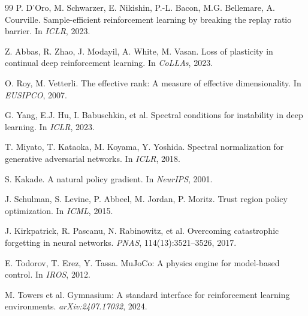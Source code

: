 \documentclass[twocolumn]{article}
\begin{document}
\begin{thebibliography}{99}
P. D'Oro, M. Schwarzer, E. Nikishin, P.-L. Bacon, M.G. Bellemare, A. Courville.
Sample-efficient reinforcement learning by breaking the replay ratio barrier.
In \emph{ICLR}, 2023.

Z. Abbas, R. Zhao, J. Modayil, A. White, M. Vasan.
Loss of plasticity in continual deep reinforcement learning.
In \emph{CoLLAs}, 2023.

O. Roy, M. Vetterli.
The effective rank: A measure of effective dimensionality.
In \emph{EUSIPCO}, 2007.

G. Yang, E.J. Hu, I. Babuschkin, et al.
Spectral conditions for instability in deep learning.
In \emph{ICLR}, 2023.

T. Miyato, T. Kataoka, M. Koyama, Y. Yoshida.
Spectral normalization for generative adversarial networks.
In \emph{ICLR}, 2018.

S. Kakade.
A natural policy gradient.
In \emph{NeurIPS}, 2001.

J. Schulman, S. Levine, P. Abbeel, M. Jordan, P. Moritz.
Trust region policy optimization.
In \emph{ICML}, 2015.

J. Kirkpatrick, R. Pascanu, N. Rabinowitz, et al.
Overcoming catastrophic forgetting in neural networks.
\emph{PNAS}, 114(13):3521--3526, 2017.

E. Todorov, T. Erez, Y. Tassa.
MuJoCo: A physics engine for model-based control.
In \emph{IROS}, 2012.

M. Towers et al.
Gymnasium: A standard interface for reinforcement learning environments.
\emph{arXiv:2407.17032}, 2024.

\end{thebibliography}
\end{document}
